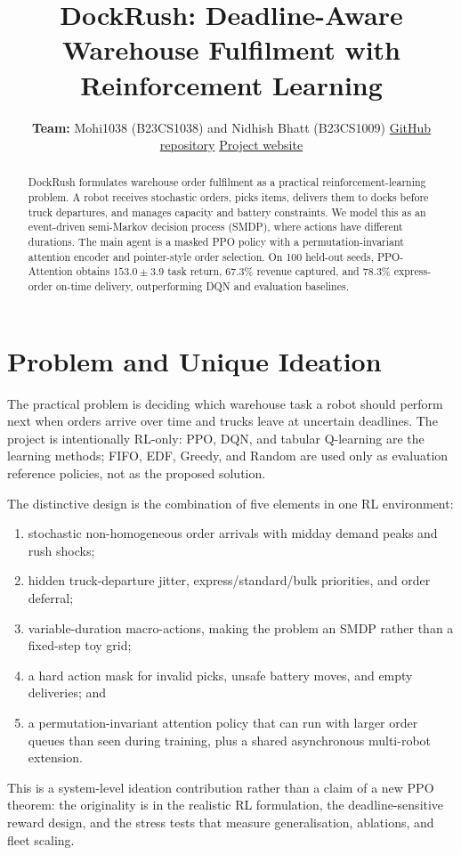 \documentclass[9pt,twocolumn]{article}
\title{\vspace{-1.2em}\textbf{DockRush: Deadline-Aware Warehouse Fulfilment with Reinforcement Learning}}
\author{\textbf{Team:} Mohi1038 (B23CS1038) and Nidhish Bhatt (B23CS1009) \quad
\href{https://github.com/Mohi1038/rl-warehouse-fulfillment}{GitHub repository}
\quad \href{https://mohi1038.github.io/rl-warehouse-fulfillment/}{Project website}}
\date{}
\begin{document}
\maketitle
\vspace{-1.5em}

\begin{abstract}
DockRush formulates warehouse order fulfilment as a practical reinforcement-learning
problem. A robot receives stochastic orders, picks items, delivers them to docks before
truck departures, and manages capacity and battery constraints. We model this as an
event-driven semi-Markov decision process (SMDP), where actions have different durations.
The main agent is a masked PPO policy with a permutation-invariant attention encoder and
pointer-style order selection. On 100 held-out seeds, PPO-Attention obtains
$153.0\pm3.9$ task return, 67.3\% revenue captured, and 78.3\% express-order on-time
delivery, outperforming DQN and evaluation baselines.
\end{abstract}

\section{Problem and Unique Ideation}
The practical problem is deciding which warehouse task a robot should perform next when
orders arrive over time and trucks leave at uncertain deadlines. The project is intentionally
RL-only: PPO, DQN, and tabular Q-learning are the learning methods; FIFO, EDF, Greedy, and
Random are used only as evaluation reference policies, not as the proposed solution.

The distinctive design is the combination of five elements in one RL environment:
\begin{enumerate}
\item stochastic non-homogeneous order arrivals with midday demand peaks and rush shocks;
\item hidden truck-departure jitter, express/standard/bulk priorities, and order deferral;
\item variable-duration macro-actions, making the problem an SMDP rather than a fixed-step toy grid;
\item a hard action mask for invalid picks, unsafe battery moves, and empty deliveries; and
\item a permutation-invariant attention policy that can run with larger order queues than seen
      during training, plus a shared asynchronous multi-robot extension.
\end{enumerate}
This is a system-level ideation contribution rather than a claim of a new PPO theorem:
the originality is in the realistic RL formulation, the deadline-sensitive reward design,
and the stress tests that measure generalisation, ablations, and fleet scaling.
\end{document}
